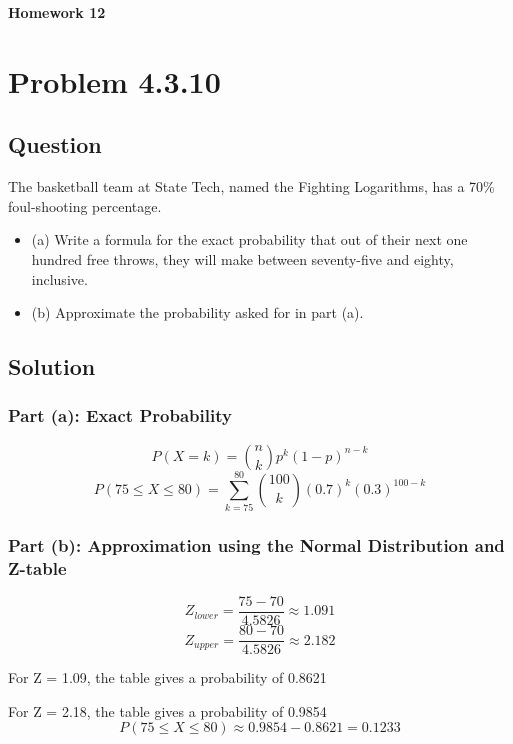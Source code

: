 \documentclass[12pt]{article}
\begin{document}
\begin{center}
  \Large \textbf{Homework 12}
\end{center}

\section*{Problem 4.3.10}
\subsection*{Question}
The basketball team at State Tech, named the Fighting Logarithms, has a 70\%  foul-shooting percentage.
\begin{itemize}
    \item (a) Write a formula for the exact probability that out of their next one hundred free throws, they will make between seventy-five and eighty, inclusive.
    \item (b) Approximate the probability asked for in part (a).
\end{itemize}

\subsection*{Solution}
\subsubsection*{Part (a): Exact Probability}
\[
P(X = k) = \binom{n}{k} p^k (1-p)^{n-k}
\]
\[
P(75 \leq X \leq 80) = \sum_{k=75}^{80} \binom{100}{k} (0.7)^k (0.3)^{100-k}
\]

\subsubsection*{Part (b): Approximation using the Normal Distribution and Z-table}
\[
Z_{lower} = \frac{75 - 70}{4.5826} \approx 1.091
\]
\[
Z_{upper} = \frac{80 - 70}{4.5826} \approx 2.182
\]

For Z = 1.09, the table gives a probability of 0.8621

For Z = 2.18, the table gives a probability of 0.9854
\[
P(75 \leq X \leq 80) \approx 0.9854 - 0.8621 = 0.1233
\]
\end{document}
